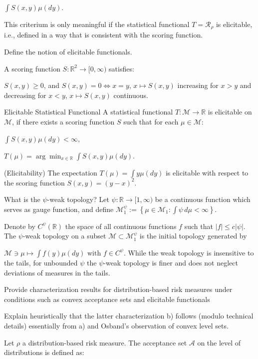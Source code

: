 \(
\int S(x, y) \mu(dy).
\)

This criterium is only meaningful if the statistical functional \( T = \mathcal{R}_{\rho} \) is elicitable, i.e., 
defined in a way that is consistent with the scoring function.


Define the notion of elicitable functionals.

A scoring function \( S : \mathbb{R}^2 \to [0, \infty) \) satisfies:

\( S(x, y) \geq 0 \), and \( S(x, y) = 0 \iff x = y \),
\( x \mapsto S(x, y) \) increasing for \( x > y \) and decreasing for \( x < y \),
\( x \mapsto S(x, y) \) continuous.

Elicitable Statistical Functional
A statistical functional \( T : \mathcal{M} \to \mathbb{R} \) is elicitable on \( \mathcal{M} \), 
if there exists a scoring function \( S \) such that for each \( \mu \in \mathcal{M} \):

\(
\int S(x, y) \mu(dy) < \infty,
\)

\(
T(\mu) = \arg \min_{x \in \mathbb{R}} \int S(x, y) \mu(dy).
\)

(Elicitability)
The expectation \( T(\mu) = \int y \mu(dy) \) is elicitable with respect to the scoring function \( S(x, y) = (y - x)^2 \).


What is the \( ψ \)-weak topology?
Let \(\psi : \mathbb{R} \to [1, \infty)\) be a continuous function which serves as gauge function, and define
\(
\mathcal{M}_1^\psi := \left\{ \mu \in \mathcal{M}_1 : \int \psi \, d\mu < \infty \right\}.
\)

Denote by \(C^\psi(\mathbb{R})\) the space of all continuous functions \(f\) such that \(|f| \leq c|\psi|\).
The \(\psi\)-weak topology on a subset \(\mathcal{M} \subset \mathcal{M}_1^\psi\) is the initial topology generated by

\(
\mathcal{M} \ni \mu \mapsto \int f(y) \mu(dy) \text{ with } f \in C^\psi.
\)
While the weak topology is insensitive to the tails, for unbounded \(\psi\) the \(\psi\)-weak topology is finer 
and does not neglect deviations of measures in the tails.


Provide characterization results for distribution-based risk measures under conditions
such as convex acceptance sets and elicitable functionals

Explain heuristically that the latter characterization b) 
follows (modulo technical details) essentially from a) and Osband’s
observation of convex level sets.

Let \(\rho\) a distribution-based risk measure.
The acceptance set \(\mathcal{A}\) on the level of distributions is defined as:

